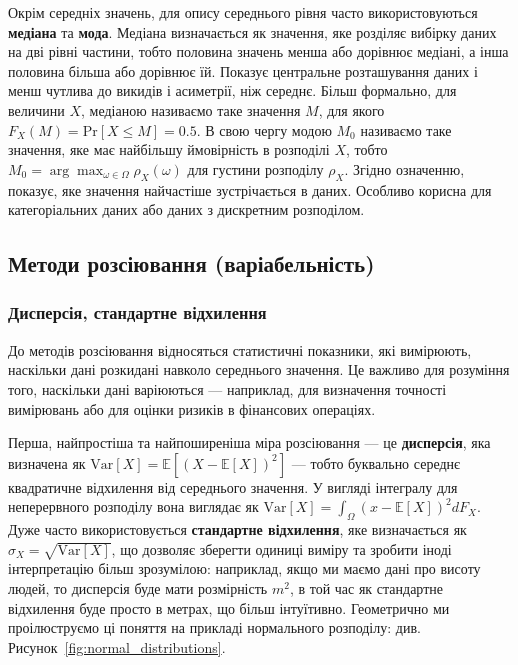\documentclass{exam_template}
\begin{document}
Окрім середніх значень, для опису середнього рівня часто використовуються
\textbf{медіана} та \textbf{мода}. Медіана визначається як значення, яке
розділяє вибірку даних на дві рівні частини, тобто половина значень менша або
дорівнює медіані, а інша половина більша або дорівнює їй. Показує центральне
розташування даних і менш чутлива до викидів і асиметрії, ніж середнє. Більш
формально, для величини $X$, медіаною називаємо таке значення $M$, для якого
$F_X(M) = \text{Pr}[X \leq M] = 0.5$. В свою чергу модою $M_0$ називаємо таке
значення, яке має найбільшу ймовірність в розподілі $X$, тобто $M_0 =
\arg\max_{\omega \in \Omega} \rho_X(\omega)$ для густини розподілу $\rho_X$.
Згідно означенню, показує, яке значення найчастіше зустрічається в даних.
Особливо корисна для категоріальних даних або даних з дискретним розподілом. 

\subsection{Методи розсіювання (варіабельність)}\label{sec:dispersion_methods}

\subsubsection{Дисперсія, стандартне відхилення}\label{sec:dispersion}
До методів розсіювання відносяться статистичні показники, які
вимірюють, наскільки дані розкидані навколо середнього значення. Це важливо
для розуміння того, наскільки дані варіюються --- наприклад, для 
визначення точності вимірювань або для оцінки ризиків в фінансових
операціях.

Перша, найпростіша та найпоширеніша міра розсіювання — це \textbf{дисперсія},
яка визначена як $\text{Var}[X] = \mathbb{E}[(X-\mathbb{E}[X])^2]$ --- тобто
буквально середнє квадратичне відхилення від середнього значення. У вигляді
інтегралу для неперервного розподілу вона виглядає як $\text{Var}[X] =
\int_{\Omega} (x-\mathbb{E}[X])^2dF_X$. Дуже часто використовується
\textbf{стандартне відхилення}, яке визначається як $\sigma_X =
\sqrt{\text{Var}[X]}$, що дозволяє зберегти одиниці виміру та зробити іноді
інтерпретацію більш зрозумілою: наприклад, якщо ми маємо дані про висоту людей,
то дисперсія буде мати розмірність $m^2$, в той час як стандартне відхилення
буде просто в метрах, що більш інтуїтивно. Геометрично ми проілюструємо ці
поняття на прикладі нормального розподілу: див.
Рисунок~\ref{fig:normal_distributions}.
\end{document}
